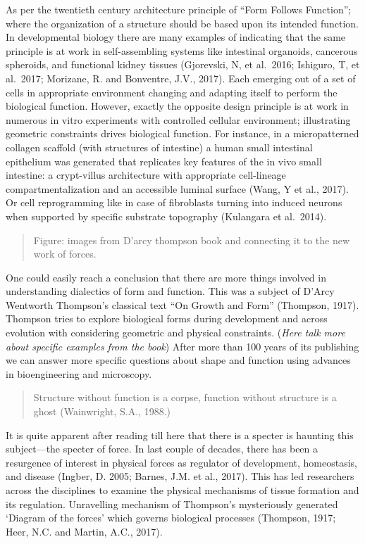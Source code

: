 As per the twentieth century architecture principle of ``Form Follows
Function''; where the organization of a structure should be based upon
its intended function. In developmental biology there are many examples
of indicating that the same principle is at work in self-assembling
systems like intestinal organoids, cancerous spheroids, and functional
kidney tissues (Gjorevski, N, et al.~2016; Ishiguro, T, et al.~2017;
Morizane, R. and Bonventre, J.V., 2017). Each emerging out of a set of
cells in appropriate environment changing and adapting itself to perform
the biological function. However, exactly the opposite design principle
is at work in numerous in vitro experiments with controlled cellular
environment; illustrating geometric constraints drives biological
function. For instance, in a micropatterned collagen scaffold (with
structures of intestine) a human small intestinal epithelium was
generated that replicates key features of the in vivo small intestine: a
crypt-villus architecture with appropriate cell-lineage
compartmentalization and an accessible luminal surface (Wang, Y et al.,
2017). Or cell reprogramming like in case of fibroblasts turning into
induced neurons when supported by specific substrate topography
(Kulangara et al.~2014).

\begin{quote}
	Figure: images from D'arcy thompson book and connecting it to the new
	work of forces.
\end{quote}

One could easily reach a conclusion that there are more things involved
in understanding dialectics of form and function. This was a subject of
D'Arcy Wentworth Thompson's classical text ``On Growth and Form''
(Thompson, 1917). Thompson tries to explore biological forms during
development and across evolution with considering geometric and physical
constraints. (\emph{Here talk more about specific examples from the
	book}) After more than 100 years of its publishing we can answer more
specific questions about shape and function using advances in
bioengineering and microscopy.

\begin{quote}
	Structure without function is a corpse, function without structure is a
	ghost (Wainwright, S.A., 1988.)
\end{quote}

It is quite apparent after reading till here that there is a specter is
haunting this subject---the specter of force. In last couple of decades,
there has been a resurgence of interest in physical forces as regulator
of development, homeostasis, and disease (Ingber, D. 2005; Barnes, J.M.
et al., 2017). This has led researchers across the disciplines to
examine the physical mechanisms of tissue formation and its regulation.
Unravelling mechanism of Thompson's mysteriously generated `Diagram of
the forces' which governs biological processes (Thompson, 1917; Heer,
N.C. and Martin, A.C., 2017).

